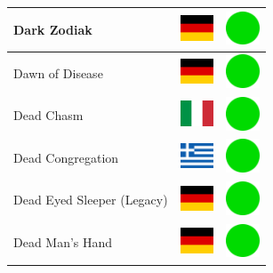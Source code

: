 \documentclass[12pt, a4paper, twoside]{report}
\begin{document}
\begin{center}
\begin{longtable}{|p{5cm}|p{2cm}|p{2cm}|}
 Dark Zodiak                                                & \includegraphics[width=1cm]{../img/flags/de} &   \includegraphics[width=1cm]{../likes/y} \\ \hline
 Dawn of Disease                                            & \includegraphics[width=1cm]{../img/flags/de} &   \includegraphics[width=1cm]{../likes/y} \\ \hline
 Dead Chasm                                                 & \includegraphics[width=1cm]{../img/flags/it} &   \includegraphics[width=1cm]{../likes/y} \\ \hline
 Dead Congregation                                          & \includegraphics[width=1cm]{../img/flags/gr} &   \includegraphics[width=1cm]{../likes/y} \\ \hline
 Dead Eyed Sleeper (Legacy)                                 & \includegraphics[width=1cm]{../img/flags/de} &   \includegraphics[width=1cm]{../likes/y} \\ \hline
 Dead Man's Hand                                            & \includegraphics[width=1cm]{../img/flags/de} &   \includegraphics[width=1cm]{../likes/y} \\ \hline

\end{longtable}
\end{center}
\end{document}
